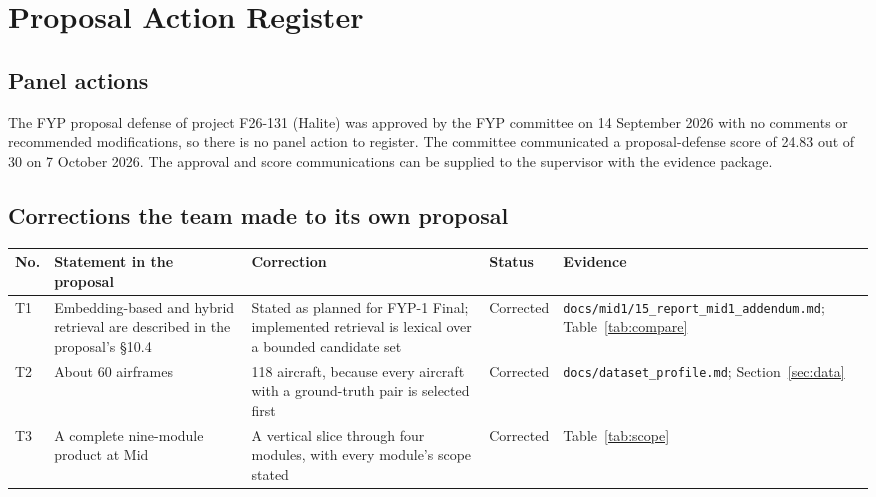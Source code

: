 \chapter{Proposal Action Register}\label{app:register}
\section*{Panel actions}
The FYP proposal defense of project F26-131 (Halite) was approved by the FYP committee on 14 September 2026 with no comments or recommended modifications, so there is no panel action to register. The committee communicated a proposal-defense score of 24.83 out of 30 on 7 October 2026. The approval and score communications can be supplied to the supervisor with the evidence package.

\section*{Corrections the team made to its own proposal}
\begin{longtable}{p{}p{}p{}p{}p{}}
\toprule \textbf{No.} & \textbf{Statement in the proposal} & \textbf{Correction} & \textbf{Status} & \textbf{Evidence} \\ \midrule \endhead
T1 & Embedding-based and hybrid retrieval are described in the proposal's \S10.4 & Stated as planned for FYP-1 Final; implemented retrieval is lexical over a bounded candidate set & Corrected & \texttt{docs/mid1/15\_report\_mid1\_addendum.md}; Table~\ref{tab:compare} \\
T2 & About 60 airframes & 118 aircraft, because every aircraft with a ground-truth pair is selected first & Corrected & \texttt{docs/dataset\_profile.md}; Section~\ref{sec:data} \\
T3 & A complete nine-module product at Mid & A vertical slice through four modules, with every module's scope stated & Corrected & Table~\ref{tab:scope} \\
\bottomrule
\end{longtable}
